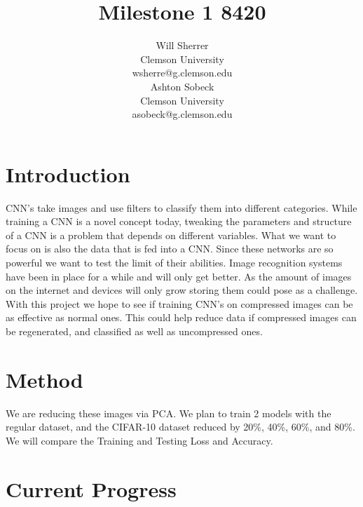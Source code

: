 \documentclass{article}
\title{Milestone 1 8420}
\author{%
	Will Sherrer \\
	Clemson University\\
	wsherre@g.clemson.edu \\
	\And Ashton Sobeck \\
	Clemson University\\
	asobeck@g.clemson.edu
}
\begin{document}
\maketitle
\section{Introduction}

CNN's take images and use filters to classify them into different categories. While training a CNN is a novel concept today, tweaking the parameters and structure of a CNN is a problem that depends on different variables. What we want to focus on is also the data that is fed into a CNN. Since these networks are so powerful we want to test the limit of their abilities. Image recognition systems have been in place for a while and will only get better. As the amount of images on the internet and devices will only grow storing them could pose as a challenge. With this project we hope to see if training CNN's on compressed images can be as effective as normal ones. This could help reduce data if compressed images can be regenerated, and classified as well as uncompressed ones. 

\section{Method}

We are reducing these images via PCA. We plan to train 2 models with the regular dataset, and the CIFAR-10 dataset reduced by 20\%, 40\%, 60\%, and 80\%. We will compare the Training and Testing Loss and Accuracy. 

\section{Current Progress}
\end{document}
